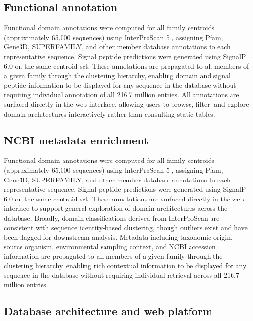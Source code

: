 \documentclass[unnumsec,webpdf,modern,large]{oup-authoring-template}
\begin{document}
\subsection{Functional annotation}

Functional domain annotations were computed for all family centroids (approximately 65,000 sequences) using InterProScan 5 \citep{jones_interproscan_2014}, assigning Pfam, Gene3D, SUPERFAMILY, and other member database annotations to each representative sequence. Signal peptide predictions were generated using SignalP 6.0 \citep{teufel_signalp_2022} on the same centroid set. These annotations are propagated to all members of a given family through the clustering hierarchy, enabling domain and signal peptide information to be displayed for any sequence in the database without requiring individual annotation of all 216.7 million entries. All annotations are surfaced directly in the web interface, allowing users to browse, filter, and explore domain architectures interactively rather than consulting static tables.

\subsection{NCBI metadata enrichment}

Functional domain annotations were computed for all family centroids (approximately 65,000 sequences) using InterProScan 5 \citep{jones_interproscan_2014}, assigning Pfam, Gene3D, SUPERFAMILY, and other member database annotations to each representative sequence. Signal peptide predictions were generated using SignalP 6.0 \citep{teufel_signalp_2022} on the same centroid set. These annotations are surfaced directly in the web interface to support general exploration of domain architectures across the database. Broadly, domain classifications derived from InterProScan are consistent with sequence identity-based clustering, though outliers exist and have been flagged for downstream analysis. Metadata including taxonomic origin, source organism, environmental sampling context, and NCBI accession information are propagated to all members of a given family through the clustering hierarchy, enabling rich contextual information to be displayed for any sequence in the database without requiring individual retrieval across all 216.7 million entries.

\subsection{Database architecture and web platform}
\end{document}
